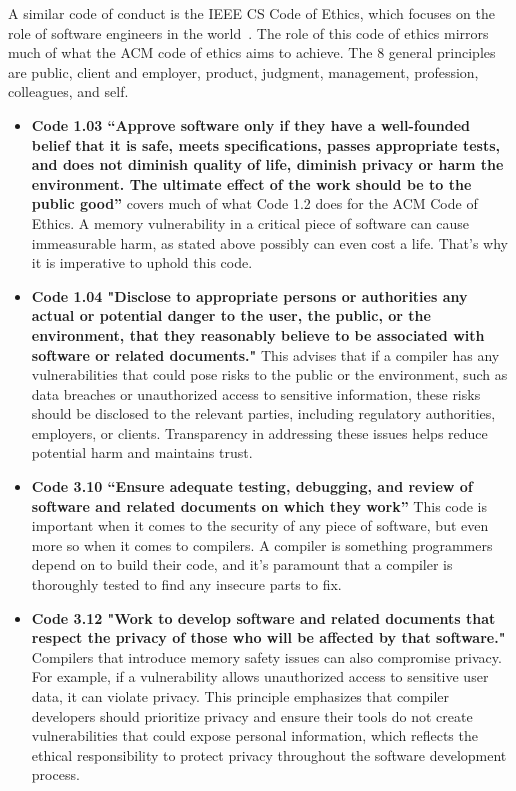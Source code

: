 \documentclass[sigconf, anonymous]{acmart}
\begin{document}
A similar code of conduct is the IEEE CS Code of Ethics, which focuses on the role of software engineers in the world~\cite{IEEECODE}. The role of this code of ethics mirrors much of what the ACM code of ethics aims to achieve. The 8 general principles are public, client and employer, product, judgment, management, profession, colleagues, and self. 

\begin{itemize}

\item \textbf{Code 1.03 “Approve software only if they have a well-founded belief that it is safe, meets specifications, passes appropriate tests, and does not diminish quality of life, diminish privacy or harm the environment. The ultimate effect of the work should be to the public good”} covers much of what Code 1.2 does for the ACM Code of Ethics. A memory vulnerability in a critical piece of software can cause immeasurable harm, as stated above possibly can even cost a life. That’s why it is imperative to uphold this code. 

\item \textbf{Code 1.04 "Disclose to appropriate persons or authorities any actual or potential danger to the user, the public, or the environment, that they reasonably believe to be associated with software or related documents."} This advises that if a compiler has any vulnerabilities that could pose risks to the public or the environment, such as data breaches or unauthorized access to sensitive information, these risks should be disclosed to the relevant parties, including regulatory authorities, employers, or clients. Transparency in addressing these issues helps reduce potential harm and maintains trust. 

\item \textbf{Code 3.10 “Ensure adequate testing, debugging, and review of software and related documents on which they work”} This code is important when it comes to the security of any piece of software, but even more so when it comes to compilers. A compiler is something programmers depend on to build their code, and it's paramount that a compiler is thoroughly tested to find any insecure parts to fix.

\item \textbf{Code 3.12 "Work to develop software and related documents that respect the privacy of those who will be affected by that software."} Compilers that introduce memory safety issues can also compromise privacy. For example, if a vulnerability allows unauthorized access to sensitive user data, it can violate privacy. This principle emphasizes that compiler developers should prioritize privacy and ensure their tools do not create vulnerabilities that could expose personal information, which reflects the ethical responsibility to protect privacy throughout the software development process. 


\end{itemize}
\end{document}
